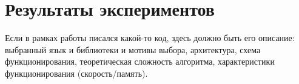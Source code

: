 \section{Результаты экспериментов}
\label{sec:Chapter4} 

Если в рамках работы писался какой-то код, здесь должно быть его
описание: выбранный язык и библиотеки и мотивы выбора, архитектура,
схема функционирования, теоретическая сложность алгоритма, характеристики
функционирования (скорость/память).

\newpage
